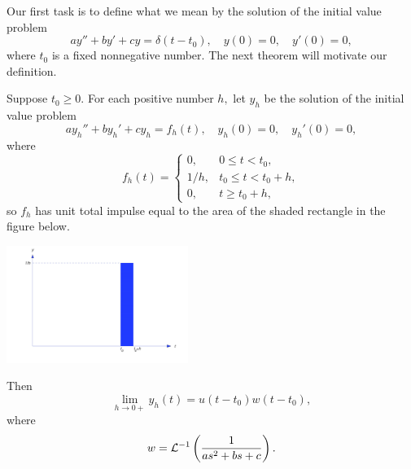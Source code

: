 \documentclass{ximera}
\begin{document}
Our first task is to define what we mean by the solution of
the initial value problem
$$
ay''+by'+cy=\delta(t-t_0), \quad  y(0)=0,\quad y'(0)=0,
$$
where $t_0$ is a fixed nonnegative number. The next theorem will
motivate our definition.

\begin{theorem}\label{thmtype:8.7.1}
Suppose $t_0\geq 0.$ For each positive number $h,$ let $y_h$ be the
solution of the initial value problem
\begin{equation} \label{eq:8.7.1}
ay_h''+by_h'+cy_h=f_h(t), \quad  y_h(0)=0,\quad y_h'(0)=0,
\end{equation}
where
\begin{equation} \label{eq:8.7.2}
f_h(t)=\left\{\begin{array}{cl} 0,&0\leq t<t_0,\\
1/h,&t_0\leq t< t_0+h,\\
0,&t\geq t_0+h,\end{array}\right.
\end{equation}
 so  $f_h$ has unit total impulse
equal to the area of the shaded rectangle in the figure below.  %
\begin{image}
 \includegraphics[height=1.5in]{fig080701.jpg}
 \end{image}


Then
\begin{equation} \label{eq:8.7.3}
\lim_{h\rightarrow 0+}y_h(t)=u(t-t_0)w(t-t_0),
\end{equation}
where
$$
w={\cal L}^{-1}\left(\frac{1}{as^2+bs+c}\right).
$$
\end{theorem}
\end{document}
